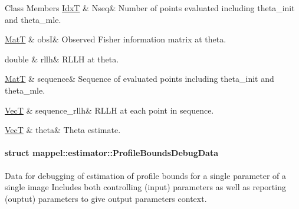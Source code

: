 \begin{DoxyFields}{Class Members}
\hyperlink{namespacemappel_ab17ec0f30b61ece292439d7ece81d3a8}{IdxT}\hypertarget{namespacemappel_1_1estimator_a303db3c63b3d285760e814aea82af3a0}{}\label{namespacemappel_1_1estimator_a303db3c63b3d285760e814aea82af3a0}
&
Nseq&
Number of points evaluated including theta\+\_\+init and theta\+\_\+mle. \\
\hline

\hyperlink{namespacemappel_a7091ab87c528041f7e2027195fad8915}{MatT}\hypertarget{namespacemappel_1_1estimator_a6fadb423b602a1f671c8d6f211663fcc}{}\label{namespacemappel_1_1estimator_a6fadb423b602a1f671c8d6f211663fcc}
&
obsI&
Observed Fisher information matrix at theta. \\
\hline

double\hypertarget{namespacemappel_1_1estimator_a6dea52884caeb6e2957d4242ea568e77}{}\label{namespacemappel_1_1estimator_a6dea52884caeb6e2957d4242ea568e77}
&
rllh&
R\+L\+LH at theta. \\
\hline

\hyperlink{namespacemappel_a7091ab87c528041f7e2027195fad8915}{MatT}\hypertarget{namespacemappel_1_1estimator_a4419c4ee9559999be39df4a7469a47fa}{}\label{namespacemappel_1_1estimator_a4419c4ee9559999be39df4a7469a47fa}
&
sequence&
Sequence of evaluated points including theta\+\_\+init and theta\+\_\+mle. \\
\hline

\hyperlink{namespacemappel_a2225ad69f358daa3f4f99282a35b9a3a}{VecT}\hypertarget{namespacemappel_1_1estimator_a4e8b3ce8d1925480aadd942d34505568}{}\label{namespacemappel_1_1estimator_a4e8b3ce8d1925480aadd942d34505568}
&
sequence\+\_\+rllh&
R\+L\+LH at each point in sequence. \\
\hline

\hyperlink{namespacemappel_a2225ad69f358daa3f4f99282a35b9a3a}{VecT}\hypertarget{namespacemappel_1_1estimator_a9f62b8797034f80b369117f77ba39725}{}\label{namespacemappel_1_1estimator_a9f62b8797034f80b369117f77ba39725}
&
theta&
Theta estimate. \\
\hline

\end{DoxyFields}
\label{structmappel_1_1estimator_1_1ProfileBoundsDebugData}
\hypertarget{namespacemappel_1_1estimator_structmappel_1_1estimator_1_1ProfileBoundsDebugData}{}
\paragraph{struct mappel\+:\+:estimator\+:\+:Profile\+Bounds\+Debug\+Data}
Data for debugging of estimation of profile bounds for a single parameter of a single image Includes both controlling (input) parameters as well as reporting (ouptut) parameters to give output parameters context. 

